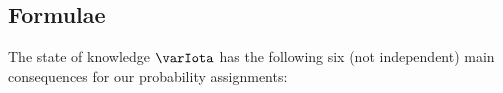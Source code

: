 \documentclass{article}
\theoremstyle{remark}
\theoremstyle{innote}
\renewcommand*{\|}{\mathpunct{|}}%
\theoremstyle{simple}
\newcommand*{\yH}{\varIota}
\begin{document}
\subsection{Formulae}
\label{nosec:main_formulae}

The state of knowledge $\yH$ has the following six (not independent) main
consequences for our probability assignments:
\end{document}
